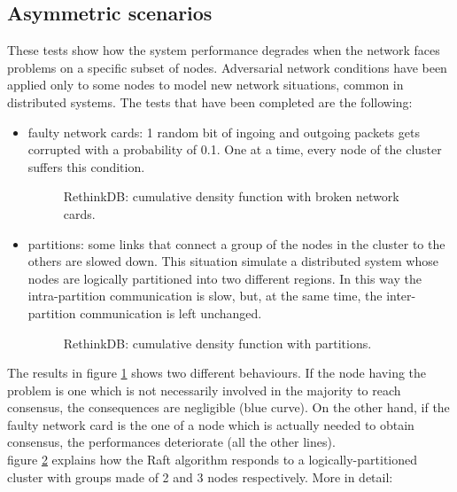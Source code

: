 \subsection{Asymmetric scenarios}
These tests show how the system performance degrades when the network faces problems on a specific subset of nodes. Adversarial network conditions have been applied only to some nodes to model new network situations, common in distributed systems. The tests that have been completed are the following:

\begin{itemize}
    \item faulty network cards: 1 random bit of ingoing and outgoing packets gets corrupted with a probability of 0.1. One at a time, every node of the cluster suffers this condition.

    \begin{figure}[H]
      \caption{RethinkDB: cumulative density function with broken network cards.}
      \label{broken_nic}
    \end{figure}

    \item partitions: some links that connect a group of the nodes in the cluster to the others are slowed down. This situation simulate a distributed system whose nodes are logically partitioned into two different regions. In this way the intra-partition communication is slow, but, at the same time, the inter-partition communication is left unchanged.

    \begin{figure}[H]
      \caption{RethinkDB: cumulative density function with partitions.}
      \label{partitions}
    \end{figure}
\end{itemize}

The results in figure \ref{broken_nic} shows two different behaviours. If the node having the problem is one which is not necessarily involved in the majority to reach consensus, the consequences are negligible (blue curve). On the other hand, if the faulty network card is the one of a node which is actually needed to obtain consensus, the performances deteriorate (all the other lines).\\
figure \ref{partitions} explains how the Raft algorithm responds to a logically-partitioned cluster with groups made of 2 and 3 nodes respectively. More in detail:


